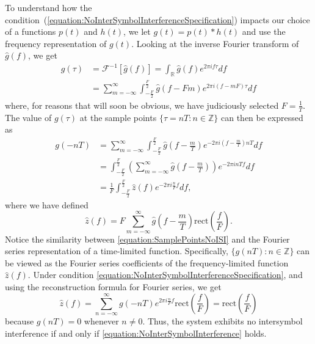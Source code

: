 To understand how the condition~(\ref{equation:NoInterSymbolInterferenceSpecification}) impacts our choice of a functions $p(t)$ and $h (t)$, we let $g(t) = p(t) * h(t)$ and use the frequency representation of $g(t)$.
Looking at the inverse Fourier transform of $\hat{g}(f)$, we get
\begin{equation*}
\begin{split}
g(\tau) &= \mathcal{F}^{-1} \left[ \hat{g} (f) \right]
= \int_{\mathbb{R}} \hat{g}(f) e^{2 \pi i f \tau} df \\
&= \sum_{m = -\infty}^{\infty} \int_{-\frac{F}{2}}^{\frac{F}{2}}
\hat{g} (f - Fm) e^{2 \pi i (f - mF) \tau} df
\end{split}
\end{equation*}
where, for reasons that will soon be obvious, we have judiciously selected $F = \frac{1}{T}$.
The value of $g(\tau)$ at the sample points $\{ \tau = nT : n \in \mathbb{Z} \}$ can then be expressed as
\begin{equation} \label{equation:SamplePointsNoISI}
\begin{split}
g(-nT) &= \sum_{m = -\infty}^{\infty} \int_{-\frac{F}{2}}^{\frac{F}{2}}
\hat{g} \left( f - \frac{m}{T} \right) e^{-2 \pi i \left( f - \frac{m}{T} \right) nT} df \\
&= \int_{-\frac{F}{2}}^{\frac{F}{2}}
\left( \sum_{m = -\infty}^{\infty} \hat{g} \left( f - \frac{m}{T} \right) \right)
e^{-2 \pi i n T f} df \\
&= \frac{1}{F} \int_{-\frac{F}{2}}^{\frac{F}{2}}
\hat{z} (f) e^{-2 \pi i \frac{n}{F} f} df ,
\end{split}
\end{equation}
where we have defined
\begin{equation*}
\hat{z}(f) = F \sum_{m = -\infty}^{\infty} \hat{g} \left( f - \frac{m}{T} \right)
\mathrm{rect} \left( \frac{f}{F} \right) .
\end{equation*}
Notice the similarity between \eqref{equation:SamplePointsNoISI} and the Fourier series representation of a time-limited function.
Specifically, $\{ g(nT) : n \in \mathbb{Z} \}$ can be viewed as the Fourier series coefficients of the frequency-limited function $\hat{z}(f)$.
Under condition \eqref{equation:NoInterSymbolInterferenceSpecification}, and using the reconstruction formula for Fourier series, we get
\begin{equation} \label{equation:NoInterSymbolInterference}
\hat{z}(f) = \sum_{n = -\infty}^{\infty} g(-nT) e^{2 \pi i \frac{n}{F} f}
\mathrm{rect} \left( \frac{f}{F} \right)
= \mathrm{rect} \left( \frac{f}{F} \right)
\end{equation}
because $g(nT) = 0$ whenever $n \neq 0$.
Thus, the system exhibits no intersymbol interference if and only if \eqref{equation:NoInterSymbolInterference} holds.

